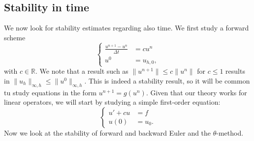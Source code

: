 \documentclass{article}
\newcommand{\R}{\mathbb{R}}
\begin{document}
\subsection{Stability in time}
We now look for stability estimates regarding also time. We first study a forward scheme 
$$
\begin{cases}
    \frac{u^{n+1}-u^n}{\Delta t} &= cu^n\\
    u^0&= u_{h,0},
\end{cases}
$$
with $c\in \R$. We note that a result such as $\|u^{n+1}\|\leq c\|u^n\|$ for $c\leq 1$ results in $\|u_h\|_{\infty, h} \leq \|u^0\|_{\infty, h}$. This is indeed a stability result, so it will be common tu study equations in the form $u^{n+1} = g(u^n)$. Given that our theory works for linear operators, we will start by studying a simple first-order equation:
$$
\begin{cases}
    u'+cu &= f\\
    u(0) &= u_0.
\end{cases}
$$
Now we look at the stability of forward and backward Euler and the $\theta$-method. 
\end{document}
